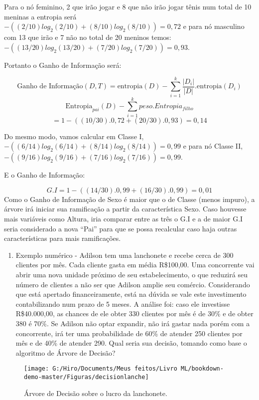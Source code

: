 \documentclass[
]{book}
\providecommand{\tightlist}{%
  \setlength{\itemsep}{0pt}\setlength{\parskip}{0pt}}
\begin{document}
Para o nó feminino, 2 que irão jogar e 8 que não irão jogar tênis num total de 10 meninas a entropia será \(- ((2/10) log_2 (2/10) + (8/10) log_2 (8/10)) = 0,72\) e para nó masculino com 13 que irão e 7 não no total de 20 meninos temos: \(- ((13/20) log_2 (13/20) + (7/20) log_2 (7/20)) = 0,93\).

Portanto o Ganho de Informação será:

\[\mbox{Ganho de Informação}(D,T)=\mbox{entropia}(D)-\displaystyle \sum_{i=1}^k \frac{|D_i|}{|D|}. \mbox{entropia}(D_i)\]
\[\mbox{Entropia}_{pai}(D)-\sum_{i=1}^k peso. Entropia_{filho}\]
\[= 1-((10/30).0,72 + (20/30). 0,93) = 0,14\]

Do mesmo modo, vamos calcular em Classe I, \(- ((6/14) log_2 (6/14) + (8/14) log_2 (8/14)) = 0,99\) e para nó Classe II, \(- ((9/16) log_2 (9/16) + (7/16) log_2 (7/16)) = 0,99\).

E o Ganho de Informação:

\[G.I = 1-((14/30) . 0,99 + (16/30) . 0,99) = 0,01\]
Como o Ganho de Informação de Sexo é maior que o de Classe (menos impuro), a árvore irá iniciar sua ramificação a partir da característica Sexo. Caso houvesse mais variáveis como Altura, iria comparar entre as três o G.I e a de maior G.I seria considerado a nova ``Pai'' para que se possa recalcular caso haja outras características para mais ramificações.

\begin{enumerate}
\def\labelenumi{\arabic{enumi}.}
\setcounter{enumi}{2}
\tightlist
\item
  Exemplo numérico - Adilson tem uma lanchonete e recebe cerca de 300 clientes por mês. Cada cliente gasta em média R\$100,00. Uma concorrente vai abrir uma nova unidade próximo de seu estabelecimento, o que reduzirá seu número de clientes a não ser que Adilson amplie seu comércio. Considerando que está apertado financeiramente, está na dúvida se vale este investimento contabilizando num prazo de 5 meses. A análise foi: caso ele investisse R\$40.000,00, as chances de ele obter 330 clientes por mês é de 30\% e de obter 380 é 70\%. Se Adilson não optar expandir, não irá gastar nada porém com a concorrente, irá ter uma probabilidade de 60\% de atender 250 clientes por mês e de 40\% de atender 290. Qual seria sua decisão, tomando como base o algoritmo de Árvore de Decisão?
\end{enumerate}

\begin{figure}

{\centering \texttt{[image: G:/Hiro/Documents/Meus feitos/Livro ML/bookdown-demo-master/Figuras/decisionlanche]} 

}

\caption{Árvore de Decisão sobre o lucro da lanchonete.}\label{fig:decisionlanche}
\end{figure}
\end{document}
